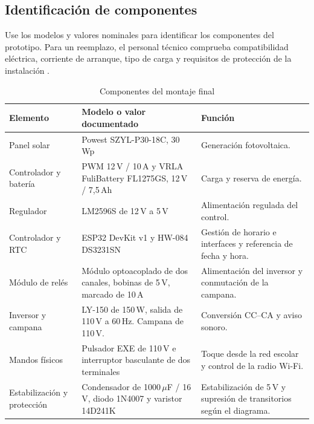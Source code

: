 \documentclass[a4paper,11pt]{article}
\begin{document}
\subsection{Identificación de componentes}
Use los modelos y valores nominales para identificar los componentes del prototipo. Para un reemplazo, el personal técnico comprueba compatibilidad eléctrica, corriente de arranque, tipo de carga y requisitos de protección de la instalación \cite{fichas,diagrama}.

\begin{table}[H]
\centering\small
\caption{Componentes del montaje final}
\begin{tabularx}{\linewidth}{@{}P{3.14cm}P{5.7cm}Y@{}}
\toprule
\textbf{Elemento} & \textbf{Modelo o valor documentado} & \textbf{Función} \\
\midrule
Panel solar & Powest SZYL-P30-18C, 30\,Wp & Generación fotovoltaica. \\
Controlador y batería & PWM 12\,V / 10\,A y VRLA FuliBattery FL1275GS, 12\,V / 7,5\,Ah & Carga y reserva de energía. \\
Regulador & LM2596S de 12\,V a 5\,V & Alimentación regulada del control. \\
Controlador y RTC & ESP32 DevKit v1 y HW-084 DS3231SN & Gestión de horario e interfaces y referencia de fecha y hora. \\
Módulo de relés & Módulo optoacoplado de dos canales, bobinas de 5\,V, marcado de 10\,A & Alimentación del inversor y conmutación de la campana. \\
Inversor y campana & LY-150 de 150\,W, salida de 110\,V a 60\,Hz. Campana de 110\,V. & Conversión CC--CA y aviso sonoro. \\
Mandos físicos & Pulsador EXE de 110\,V e interruptor basculante de dos terminales & Toque desde la red escolar y control de la radio Wi-Fi. \\
Estabilización y protección & Condensador de 1000\,\(\mu\)F / 16\,V, diodo 1N4007 y varistor 14D241K & Estabilización de 5\,V y supresión de transitorios según el diagrama. \\
\bottomrule
\end{tabularx}
\end{table}
\end{document}
